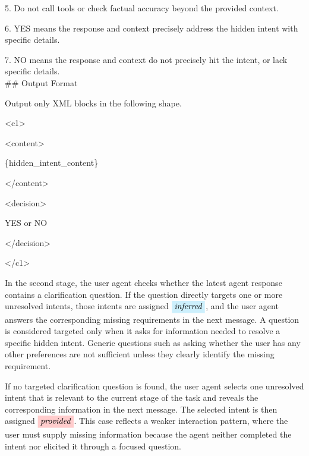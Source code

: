 \documentclass{llmxive}
\providecommand{\inferred}{\colorbox{cyan!20}{\textit{inferred}}}
\providecommand{\provided}{\colorbox{red!20}{\textit{provided}}}
\providecommand{\tcolorboxPromptUserAgentStageTwoTitleText}{\fontsize{10}{12}\selectfont}
\providecommand{\tcolorboxPromptUserAgentStageTwoCommonText}{\fontsize{7.5}{9}\selectfont}
\providecommand{\tcolorboxPromptUserAgentStageTwoTitleBeforeVspace}{\vspace{10 pt}}
\providecommand{\tcolorboxPromptUserAgentStageTwoCommonTextLineSkip}{\setlength{\baselineskip}{5 pt}}
\begin{document}
{5. Do not call tools or check factual accuracy beyond the provided context.

6. YES means the response and context precisely address the hidden intent with specific details.

7. NO means the response and context do not precisely hit the intent, or lack specific details. \\

\#\# Output Format

Output only XML blocks in the following shape.

<c1>

<content>

\{hidden\_intent\_content\}

</content>

<decision>

YES or NO

</decision>

</c1>
}

In the second stage, the user agent checks whether the latest agent response contains a clarification question. If the question directly targets one or more unresolved intents, those intents are assigned $\inferred$, and the user agent answers the corresponding missing requirements in the next message. A question is considered targeted only when it asks for information needed to resolve a specific hidden intent. Generic questions such as asking whether the user has any other preferences are not sufficient unless they clearly identify the missing requirement.

If no targeted clarification question is found, the user agent selects one unresolved intent that is relevant to the current stage of the task and reveals the corresponding information in the next message. The selected intent is then assigned $\provided$. This case reflects a weaker interaction pattern, where the user must supply missing information because the agent neither completed the intent nor elicited it through a focused question.




\renewcommand{\tcolorboxPromptUserAgentStageTwoTitleText}{}
\renewcommand{\tcolorboxPromptUserAgentStageTwoCommonText}{}
\renewcommand{\tcolorboxPromptUserAgentStageTwoTitleBeforeVspace}{}
\renewcommand{\tcolorboxPromptUserAgentStageTwoCommonTextLineSkip}{}
\end{document}
